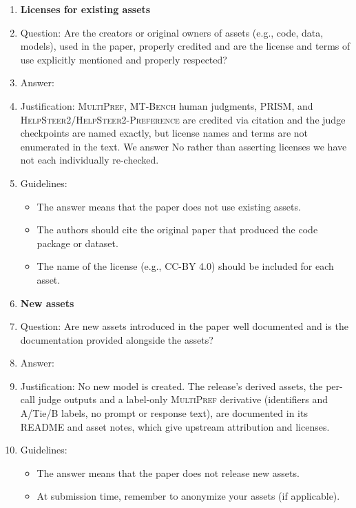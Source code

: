 \documentclass{article}
\begin{document}
\begin{enumerate}
\item {\bf Licenses for existing assets}
    \item[] Question: Are the creators or original owners of assets (e.g., code, data, models), used in the paper, properly credited and are the license and terms of use explicitly mentioned and properly respected?
    \item[] Answer: \answerNo{}
    \item[] Justification: \textsc{MultiPref}, \textsc{MT-Bench} human judgments, \textsc{PRISM}, and \textsc{HelpSteer2}/\textsc{HelpSteer2-Preference} are credited via citation and the judge checkpoints are named exactly, but license names and terms are not enumerated in the text. We answer No rather than asserting licenses we have not each individually re-checked.
    \item[] Guidelines:
    \begin{itemize}
        \item The answer \answerNA{} means that the paper does not use existing assets.
        \item The authors should cite the original paper that produced the code package or dataset.
        \item The name of the license (e.g., CC-BY 4.0) should be included for each asset.
    \end{itemize}

\item {\bf New assets}
    \item[] Question: Are new assets introduced in the paper well documented and is the documentation provided alongside the assets?
    \item[] Answer: \answerYes{}
    \item[] Justification: No new model is created. The release's derived assets, the per-call judge outputs and a label-only \textsc{MultiPref} derivative (identifiers and A/Tie/B labels, no prompt or response text), are documented in its README and asset notes, which give upstream attribution and licenses.
    \item[] Guidelines:
    \begin{itemize}
        \item The answer \answerNA{} means that the paper does not release new assets.
        \item At submission time, remember to anonymize your assets (if applicable).
    \end{itemize}


\end{enumerate}
\end{document}
